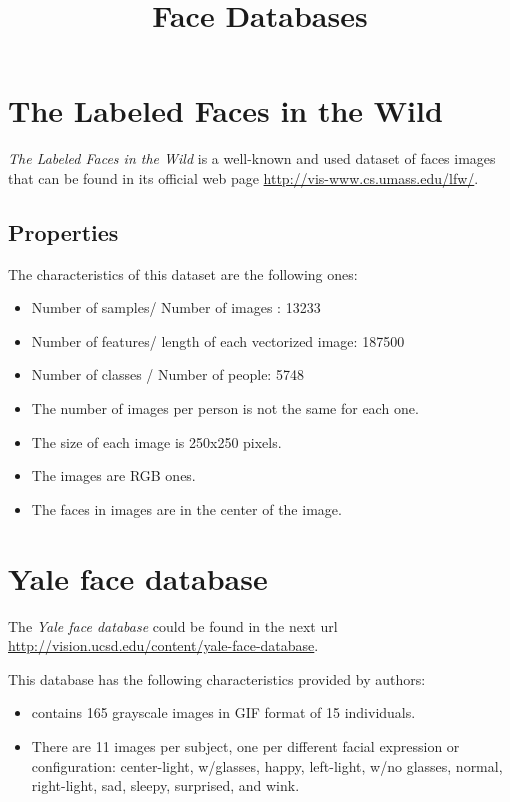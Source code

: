 \documentclass[a4paper]{article}
\begin{document}
\title{Face Databases}
\maketitle

\section{The Labeled Faces in the Wild}

\textit{The Labeled Faces in the Wild} is a well-known and used dataset of faces images that can be found in its official web page \url{http://vis-www.cs.umass.edu/lfw/}.\\

\subsection{Properties}
The characteristics of this dataset are the following ones:
\begin{itemize}
 \item Number of samples/ Number of images : 13233
 \item Number of features/ length of each vectorized image: 187500
 \item Number of classes / Number of people: 5748\\
\item The number of images per person is not the same for each one.
\item The size of each image is 250x250 pixels.
\item The images are RGB ones.
\item The faces in images are in the center of the image.\\
\end{itemize}


\section{Yale face database}
The \textit{Yale face database} could be found in the next url \url{http://vision.ucsd.edu/content/yale-face-database}.

This database has the following characteristics provided by authors:
\begin{itemize}
\item contains 165 grayscale images in GIF format of 15 individuals. \item There are 11 images per subject, one per different facial expression or configuration: center-light, w/glasses, happy, left-light, w/no glasses, normal, right-light, sad, sleepy, surprised, and wink.
\end{itemize}
\end{document}
